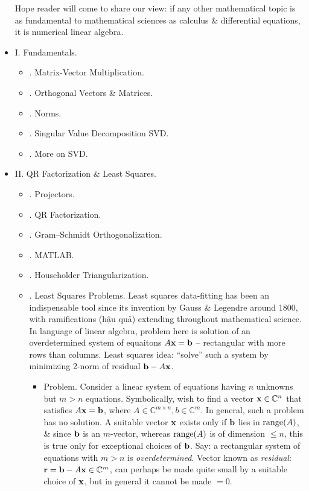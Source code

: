 \documentclass{article}
\begin{document}
\begin{itemize}
	Hope reader will come to share our view: if any other mathematical topic is as fundamental to mathematical sciences as calculus \& differential equations, it is numerical linear algebra.
	\item {\sf I. Fundamentals.}
	\begin{itemize}
		\item {. Matrix-Vector Multiplication.}
		\item {. Orthogonal Vectors \& Matrices.}
		\item {. Norms.}
		\item {. Singular Value Decomposition SVD.}
		\item {. More on SVD.}
	\end{itemize}
	\item {\sf II. QR Factorization \& Least Squares.}
	\begin{itemize}
		\item {. Projectors.}
		\item {. QR Factorization.}
		\item {. Gram--Schmidt Orthogonalization.}
		\item {. MATLAB.}
		\item {. Householder Triangularization.}
		\item {. Least Squares Problems.} Least squares data-fitting has been an indispensable tool since its invention by {\sc Gauss \& Legendre} around 1800, with ramifications (hậu quả) extending throughout mathematical science. In language of linear algebra, problem here is solution of an overdetermined system of equaitons $A{\bf x} = {\bf b}$ -- rectangular with more rows than columns. Least squares idea: ``solve'' such a system by minimizing 2-norm of residual ${\bf b} - A{\bf x}$.
		\begin{itemize}
			\item {\sf Problem.} Consider a linear system of equations having $n$ unknowns but $m > n$ equations. Symbolically, wish to find a vector ${\bf x}\in\mathbb{C}^n$ that satisfies $A{\bf x} = {\bf b}$, where $A\in\mathbb{C}^{m\times n},b\in\mathbb{C}^m$. In general, such a problem has no solution. A suitable vector ${\bf x}$ exists only if ${\bf b}$ lies in ${\rm range}(A)$, \& since ${\bf b}$ is an $m$-vector, whereas ${\rm range}(A)$ is of dimension $\le n$, this is true only for exceptional choices of ${\bf b}$. Say: a rectangular system of equations with $m > n$ is {\it overdetermined}. Vector known as {\it residual}: ${\bf r} = {\bf b} - A{\bf x}\in\mathbb{C}^m$, can perhaps be made quite small by a suitable choice of ${\bf x}$, but in general it cannot be made $= 0$.
			

\end{itemize}
\end{itemize}
\end{itemize}
\end{document}
